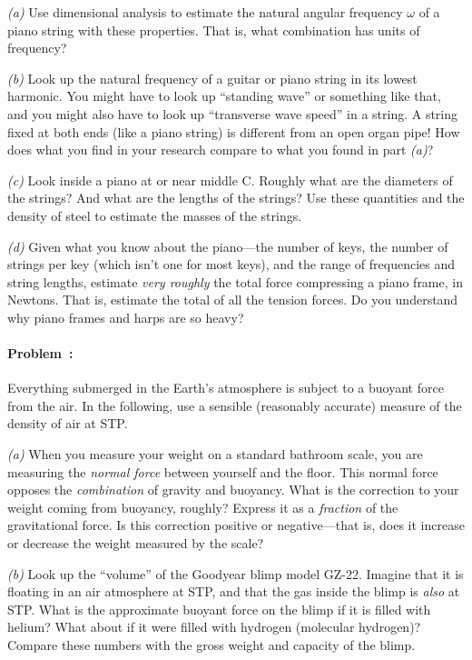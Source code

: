 \documentclass[12pt]{article}
\begin{document}
\textsl{(a)} Use dimensional analysis to estimate the natural angular
frequency $\omega$ of a piano string with these properties. That is,
what combination has units of frequency?

\textsl{(b)} Look up the natural frequency of a guitar or piano string
in its lowest harmonic. You might have to look up ``standing wave'' or
something like that, and you might also have to look up ``transverse
wave speed'' in a string. A string fixed at both ends (like a piano
string) is different from an open organ pipe! How does what you find
in your research compare to what you found in part \textsl{(a)}?

\textsl{(c)} Look inside a piano at or near middle C. Roughly what are
the diameters of the strings? And what are the lengths of the strings?
Use these quantities and the density of steel to estimate the masses
of the strings.

\textsl{(d)} Given what you know about the piano---the number of keys,
the number of strings per key (which isn't one for most keys), and the
range of frequencies and string lengths, estimate \emph{very roughly}
the total force compressing a piano frame, in Newtons. That is,
estimate the total of all the tension forces. Do you understand why
piano frames and harps are so heavy?

\paragraph{Problem~\theproblem:}%
Everything submerged in the Earth's atmosphere is subject to a buoyant
force from the air.  In the following, use a sensible (reasonably
accurate) measure of the density of air at STP.

\textsl{(a)} When you measure your weight on a standard bathroom
scale, you are measuring the \emph{normal force} between yourself and
the floor.  This normal force opposes the \emph{combination} of
gravity and buoyancy.  What is the correction to your weight coming
from buoyancy, roughly?  Express it as a \emph{fraction} of the
gravitational force.  Is this correction positive or negative---that
is, does it increase or decrease the weight measured by the scale?

\textsl{(b)} Look up the ``volume'' of the Goodyear blimp model GZ-22.
Imagine that it is floating in an air atmosphere at STP, and that the
gas inside the blimp is \emph{also} at STP.  What is the approximate
buoyant force on the blimp if it is filled with helium?  What about if
it were filled with hydrogen (molecular hydrogen)?  Compare these
numbers with the gross weight and capacity of the blimp.
\end{document}
